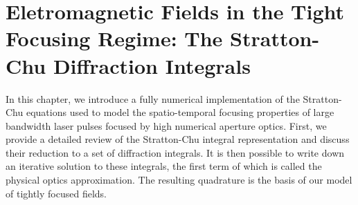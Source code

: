 \documentclass[11pt,SymmetricalJury]{inrsthesis/inrsthesis}
\newenvironment{chaptersummary}{%
  \begin{quotation}
  \SingleSpacing
  \setlength{\parskip}{\baselineskip}}{%
  \end{quotation}}
\begin{document}

\chapter{Eletromagnetic Fields in the Tight Focusing Regime: The Stratton-Chu Diffraction Integrals}
\label{chapter:stratton-chu}


In this chapter, we introduce a fully numerical implementation of the Stratton-Chu
equations used to model the spatio-temporal focusing properties of large
bandwidth laser pulses focused by high numerical aperture optics. First, we
provide a detailed review of the Stratton-Chu integral representation and discuss
their reduction to a set of diffraction integrals. 
It is then possible to write down an iterative solution to these integrals, the
first term of which is called the physical optics approximation. The resulting
quadrature is the basis of our model of tightly focused fields.
\end{document}
